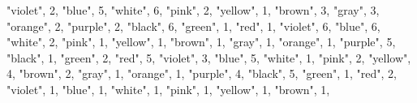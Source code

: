 \documentclass[
]{article}
\newenvironment{Shaded}{\begin{snugshade}}{\end{snugshade}}
\newcommand{\DecValTok}[1]{\textcolor[rgb]{0.00,0.00,0.81}{#1}}
\newcommand{\NormalTok}[1]{#1}
\newcommand{\StringTok}[1]{\textcolor[rgb]{0.31,0.60,0.02}{#1}}
\begin{document}
\begin{Shaded}
\begin{Highlighting}[]
  \StringTok{"violet"}\NormalTok{, }\DecValTok{2}\NormalTok{,}
  \StringTok{"blue"}\NormalTok{, }\DecValTok{5}\NormalTok{,}
  \StringTok{"white"}\NormalTok{, }\DecValTok{6}\NormalTok{,}
  \StringTok{"pink"}\NormalTok{, }\DecValTok{2}\NormalTok{,}
  \StringTok{"yellow"}\NormalTok{, }\DecValTok{1}\NormalTok{,}
  \StringTok{"brown"}\NormalTok{, }\DecValTok{3}\NormalTok{,}
  \StringTok{"gray"}\NormalTok{, }\DecValTok{3}\NormalTok{,}
  \StringTok{"orange"}\NormalTok{, }\DecValTok{2}\NormalTok{,}
  \StringTok{"purple"}\NormalTok{, }\DecValTok{2}\NormalTok{,}
    \StringTok{"black"}\NormalTok{, }\DecValTok{6}\NormalTok{,}
  \StringTok{"green"}\NormalTok{, }\DecValTok{1}\NormalTok{,}
  \StringTok{"red"}\NormalTok{, }\DecValTok{1}\NormalTok{,}
  \StringTok{"violet"}\NormalTok{, }\DecValTok{6}\NormalTok{,}
  \StringTok{"blue"}\NormalTok{, }\DecValTok{6}\NormalTok{,}
  \StringTok{"white"}\NormalTok{, }\DecValTok{2}\NormalTok{,}
  \StringTok{"pink"}\NormalTok{, }\DecValTok{1}\NormalTok{,}
  \StringTok{"yellow"}\NormalTok{, }\DecValTok{1}\NormalTok{,}
  \StringTok{"brown"}\NormalTok{, }\DecValTok{1}\NormalTok{,}
  \StringTok{"gray"}\NormalTok{, }\DecValTok{1}\NormalTok{,}
  \StringTok{"orange"}\NormalTok{, }\DecValTok{1}\NormalTok{,}
  \StringTok{"purple"}\NormalTok{, }\DecValTok{5}\NormalTok{,}
    \StringTok{"black"}\NormalTok{, }\DecValTok{1}\NormalTok{,}
  \StringTok{"green"}\NormalTok{, }\DecValTok{2}\NormalTok{,}
  \StringTok{"red"}\NormalTok{, }\DecValTok{5}\NormalTok{,}
  \StringTok{"violet"}\NormalTok{, }\DecValTok{3}\NormalTok{,}
  \StringTok{"blue"}\NormalTok{, }\DecValTok{5}\NormalTok{,}
  \StringTok{"white"}\NormalTok{, }\DecValTok{1}\NormalTok{,}
  \StringTok{"pink"}\NormalTok{, }\DecValTok{2}\NormalTok{,}
  \StringTok{"yellow"}\NormalTok{, }\DecValTok{4}\NormalTok{,}
  \StringTok{"brown"}\NormalTok{, }\DecValTok{2}\NormalTok{,}
  \StringTok{"gray"}\NormalTok{, }\DecValTok{1}\NormalTok{,}
  \StringTok{"orange"}\NormalTok{, }\DecValTok{1}\NormalTok{,}
  \StringTok{"purple"}\NormalTok{, }\DecValTok{4}\NormalTok{,}
    \StringTok{"black"}\NormalTok{, }\DecValTok{5}\NormalTok{,}
  \StringTok{"green"}\NormalTok{, }\DecValTok{1}\NormalTok{,}
  \StringTok{"red"}\NormalTok{, }\DecValTok{2}\NormalTok{,}
  \StringTok{"violet"}\NormalTok{, }\DecValTok{1}\NormalTok{, }
  \StringTok{"blue"}\NormalTok{, }\DecValTok{1}\NormalTok{,}
  \StringTok{"white"}\NormalTok{, }\DecValTok{1}\NormalTok{,}
  \StringTok{"pink"}\NormalTok{, }\DecValTok{1}\NormalTok{,}
  \StringTok{"yellow"}\NormalTok{, }\DecValTok{1}\NormalTok{,}
  \StringTok{"brown"}\NormalTok{, }\DecValTok{1}\NormalTok{,}

\end{Highlighting}
\end{Shaded}
\end{document}
